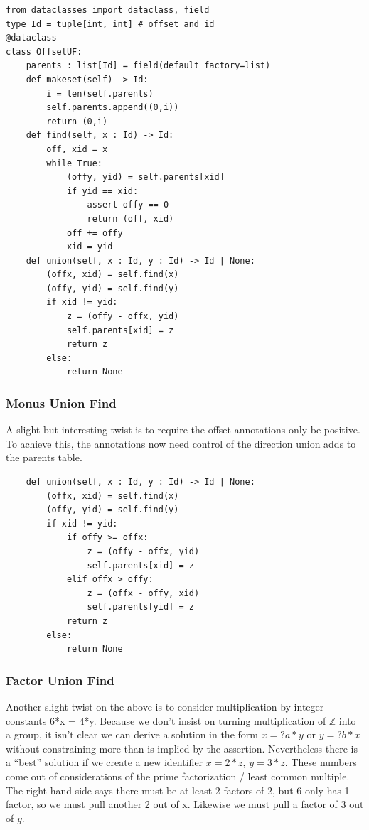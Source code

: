 \documentclass{article}%
\begin{document}
\begin{lstlisting}
from dataclasses import dataclass, field
type Id = tuple[int, int] # offset and id
@dataclass
class OffsetUF:
    parents : list[Id] = field(default_factory=list)
    def makeset(self) -> Id:
        i = len(self.parents)
        self.parents.append((0,i))
        return (0,i)
    def find(self, x : Id) -> Id:
        off, xid = x
        while True:
            (offy, yid) = self.parents[xid]
            if yid == xid:
                assert offy == 0
                return (off, xid)
            off += offy
            xid = yid
    def union(self, x : Id, y : Id) -> Id | None:
        (offx, xid) = self.find(x)
        (offy, yid) = self.find(y)
        if xid != yid:
            z = (offy - offx, yid)
            self.parents[xid] = z
            return z
        else:
            return None
\end{lstlisting}

\subsubsection{Monus Union Find}

A slight but interesting twist is to require the offset annotations only be positive. To achieve this, the annotations now need control of the direction union adds to the parents table.

\begin{lstlisting}
    def union(self, x : Id, y : Id) -> Id | None:
        (offx, xid) = self.find(x)
        (offy, yid) = self.find(y)
        if xid != yid:
            if offy >= offx:
                z = (offy - offx, yid)
                self.parents[xid] = z
            elif offx > offy:
                z = (offx - offy, xid)
                self.parents[yid] = z
            return z
        else:
            return None
\end{lstlisting}

\subsubsection{Factor Union Find}

Another slight twist on the above is to consider multiplication by integer constants 6*x = 4*y. Because we don’t insist on turning multiplication of $\mathbb{Z}$ into a group, it isn’t clear we can derive a solution in the form $x = ?a * y$ or $y = ?b * x$ without constraining more than is implied by the assertion. Nevertheless there is a “best” solution if we create a new identifier $x = 2*z$, $y = 3*z$. These numbers come out of considerations of the prime factorization / least common multiple. The right hand side says there must be at least 2 factors of 2, but 6 only has 1 factor, so we must pull another 2 out of x. Likewise we must pull a factor of 3 out of $y$.
\end{document}
